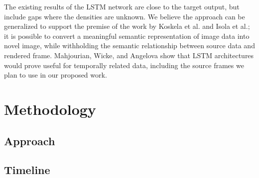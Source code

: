 \documentclass{article}
\begin{document}
The existing results of the LSTM network are close to the
target output, but include gaps where the densities are unknown.
We believe the approach can be generalized to support the premise of
the work by Koskela et al. and Isola et al.;
it is possible to convert a meaningful semantic representation
of image data into novel image, while withholding the semantic relationship
between source data and rendered frame. Mahjourian, Wicke, and Angelova show that
LSTM architectures would prove useful for temporally related data,
including the source frames we plan to use in our proposed work.

\section{Methodology}
\label{sec:methodology}

\subsection{Approach}
\label{subsec:approach}

\subsection{Timeline}
\label{subsec:timeline}



\end{document}
